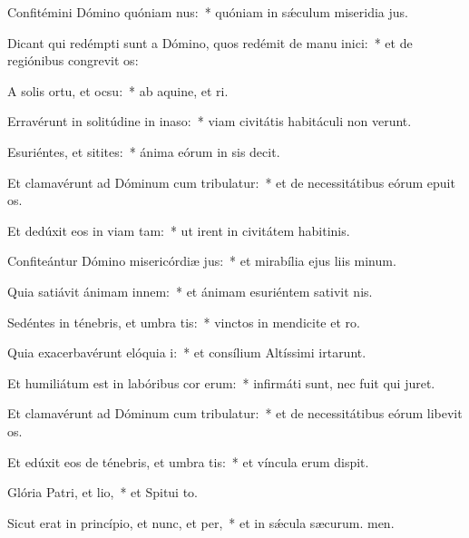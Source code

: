 \item Confitémini Dómino quóniam nus:~* quóniam in sǽculum miseridia jus.
\item Dicant qui redémpti sunt a Dómino, quos redémit de manu inici:~* et de regiónibus congrevit os:
\item A solis ortu, et ocsu:~* ab aquine, et ri.
\item Erravérunt in solitúdine in inaso:~* viam civitátis habitáculi non verunt.
\item Esuriéntes, et sitites:~* ánima eórum in sis decit.
\item Et clamavérunt ad Dóminum cum tribulatur:~* et de necessitátibus eórum epuit os.
\item Et dedúxit eos in viam tam:~* ut irent in civitátem habitinis.
\item Confiteántur Dómino misericórdiæ jus:~* et mirabília ejus liis minum.
\item Quia satiávit ánimam innem:~* et ánimam esuriéntem sativit nis.
\item Sedéntes in ténebris, et umbra tis:~* vinctos in mendicite et ro.
\item Quia exacerbavérunt elóquia i:~* et consílium Altíssimi irtarunt.
\item Et humiliátum est in labóribus cor erum:~* infirmáti sunt, nec fuit qui juret.
\item Et clamavérunt ad Dóminum cum tribulatur:~* et de necessitátibus eórum libevit os.
\item Et edúxit eos de ténebris, et umbra tis:~* et víncula erum dispit.
\item Glória Patri, et lio,~* et Spitui to.
\item Sicut erat in princípio, et nunc, et per,~* et in sǽcula sæcurum. men.
